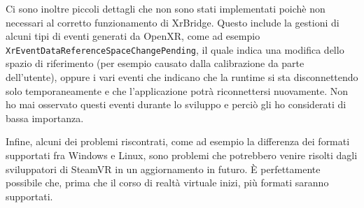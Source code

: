 \documentclass[twoside]{supsistudent}
\begin{document}
Ci sono inoltre piccoli dettagli che non sono stati implementati poichè non necessari al corretto funzionamento di XrBridge. Questo include la gestioni di alcuni tipi di eventi generati da OpenXR, come ad esempio \texttt{XrEventDataReferenceSpaceChangePending}, il quale indica una modifica dello spazio di riferimento (per esempio causato dalla calibrazione da parte dell'utente), oppure i vari eventi che indicano che la runtime si sta disconnettendo solo temporaneamente e che l'applicazione potrà riconnettersi nuovamente. Non ho mai osservato questi eventi durante lo sviluppo e perciò gli ho considerati di bassa importanza.

Infine, alcuni dei problemi riscontrati, come ad esempio la differenza dei formati supportati fra Windows e Linux, sono problemi che potrebbero venire risolti dagli sviluppatori di SteamVR in un aggiornamento in futuro. È perfettamente possibile che, prima che il corso di realtà virtuale inizi, più formati saranno supportati.

\nocite{*}


\end{document}

